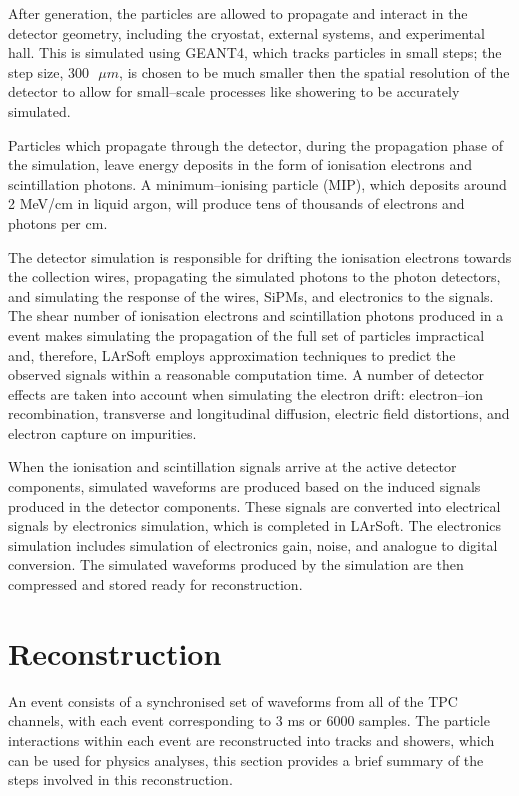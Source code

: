 After generation, the particles are allowed to propagate and interact in the 
detector geometry, including the cryostat, external systems, and experimental
hall. This is simulated using GEANT4\cite{Agostinelli:2002hh}, which tracks 
particles in small steps; the step size, $300 \mbox{ } \mu m$, is chosen to be 
much smaller then the spatial resolution of the detector to allow for 
small--scale processes like showering to be accurately simulated. 

Particles which propagate through the detector, during the propagation phase of
the simulation, leave energy deposits in the form of ionisation electrons and
scintillation photons. A minimum--ionising particle (MIP), which deposits 
around 2 MeV/cm in liquid argon, will produce tens of thousands of electrons 
and photons per cm.

The detector simulation is responsible for drifting the ionisation electrons 
towards the collection wires, propagating the simulated photons to the photon 
detectors, and simulating the response of the wires, SiPMs, and electronics to 
the signals. The shear number of ionisation electrons and scintillation 
photons produced in a \protodune{} event makes simulating the propagation of 
the full set of particles impractical and, therefore, LArSoft employs 
approximation techniques to predict the observed signals within a reasonable 
computation time. A number of detector effects are taken into account when 
simulating the electron drift: electron--ion recombination, transverse and 
longitudinal diffusion, electric field distortions, and electron capture on 
impurities. 

When the ionisation and scintillation signals arrive at the active detector 
components, simulated waveforms are produced based on the induced signals 
produced in the detector components. These signals are converted into 
electrical signals by electronics simulation, which is completed in LArSoft. 
The electronics simulation includes simulation of electronics gain, noise, 
and analogue to digital conversion. The simulated waveforms produced by the 
\protodune{} simulation are then compressed and stored ready for reconstruction.

\section{Reconstruction} \label{sec:reconstruction}

An event consists of a synchronised set of waveforms from all of the TPC 
channels, with each event corresponding to 3 ms or 6000 samples. The particle
interactions within each event are reconstructed into tracks and showers, 
which can be used for physics analyses, this section provides a brief summary 
of the steps involved in this reconstruction.

